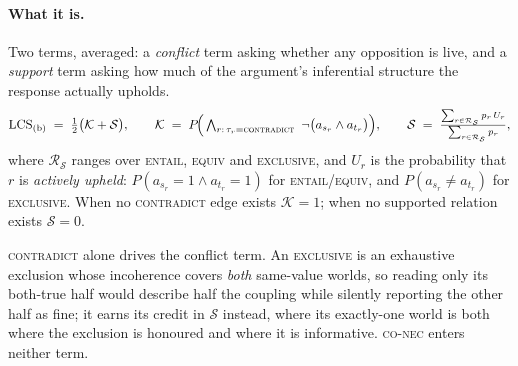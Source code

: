 \documentclass[11pt]{article}
\begin{document}
\paragraph{What it is.} Two terms, averaged: a \emph{conflict} term asking whether any
opposition is live, and a \emph{support} term asking how much of the argument's inferential
structure the response actually upholds.
\begin{equation}
  \mathrm{LCS}_{\text{(b)}}
  \;=\;
  \tfrac12\big(\mathcal K + \mathcal S\big),
  \qquad
  \mathcal K \;=\; P\!\Big(\textstyle\bigwedge_{r:\,\tau_r=\textsc{contradict}}\ \neg\big(a_{s_r}\wedge a_{t_r}\big)\Big),
  \qquad
  \mathcal S \;=\; \frac{\sum_{r\in\mathcal R_{\mathcal S}} p_r\,U_r}{\sum_{r\in\mathcal R_{\mathcal S}} p_r},
  \label{eq:cons}
\end{equation}
where $\mathcal R_{\mathcal S}$ ranges over \textsc{entail}, \textsc{equiv} and
\textsc{exclusive}, and $U_r$ is the probability that $r$ is \emph{actively upheld}:
$P(a_{s_r}{=}1\wedge a_{t_r}{=}1)$ for \textsc{entail}/\textsc{equiv}, and
$P(a_{s_r}\neq a_{t_r})$ for \textsc{exclusive}. When no \textsc{contradict} edge exists
$\mathcal K{=}1$; when no supported relation exists $\mathcal S{=}0$.

\textsc{contradict} alone drives the conflict term. An \textsc{exclusive} is an exhaustive
exclusion whose incoherence covers \emph{both} same-value worlds, so reading only its
both-true half would describe half the coupling while silently reporting the other half as
fine; it earns its credit in $\mathcal S$ instead, where its exactly-one world is both where
the exclusion is honoured and where it is informative. \textsc{co-nec} enters neither term.
\end{document}
